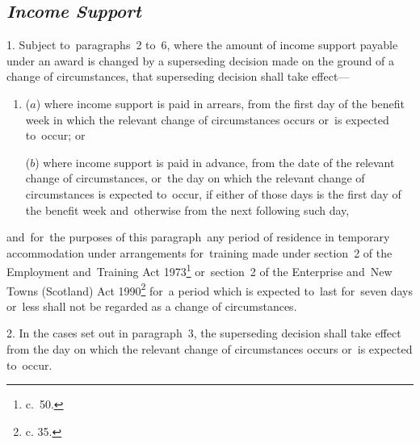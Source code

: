 \documentclass[12pt,a4paper]{article}
\begin{document}
\renewcommand\parthead{--- Schedule 3A}


\subsection*{\itshape Income Support}

1.  Subject to~paragraphs~2 to~6, where the amount of income support payable under an award is changed by a superseding decision made on the ground of a change of circumstances, that superseding decision shall take effect—
\begin{enumerate}\item[]
($a$) where income support is paid in arrears, from the first day of the benefit week in which the relevant change of circumstances occurs or~is expected to~occur; or

($b$) where income support is paid in advance, from the date of the relevant change of circumstances, or~the day on which the relevant change of circumstances is expected to~occur, if either of those days is the first day of the benefit week and~otherwise from the next following such day,
\end{enumerate}
and~for~the purposes of this paragraph~any period of residence in temporary accommodation under arrangements for~training made under section~2 of the Employment and~Training Act 1973\footnote{ c.~50.} or~section~2 of the Enterprise and~New Towns (Scotland) Act 1990\footnote{ c. 35.} for~a period which is expected to~last for~seven days or~less shall not be regarded as a change of circumstances.

\medskip

2.  In the cases set out in paragraph~3, the superseding decision shall take effect from the day on which the relevant change of circumstances occurs or~is expected to~occur.

\medskip
\end{document}
